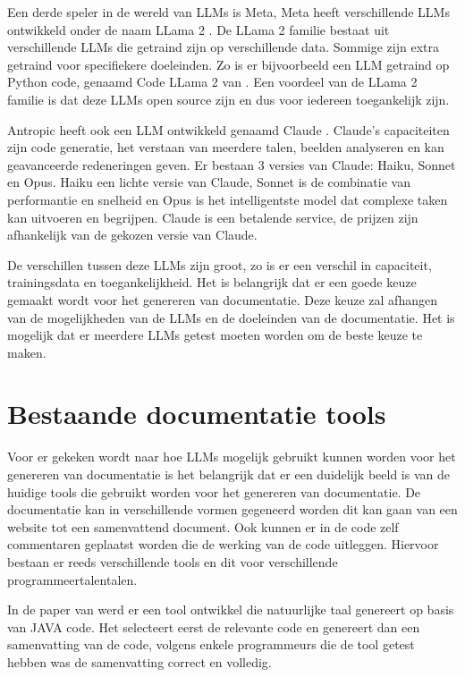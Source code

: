 Een derde speler in de wereld van LLMs is Meta, Meta heeft verschillende LLMs ontwikkeld onder de naam LLama 2 \autocite{Meta2024}.
De LLama 2 familie bestaat uit verschillende LLMs die getraind zijn op verschillende data. Sommige zijn extra getraind voor specifiekere doeleinden.
Zo is er bijvoorbeeld een LLM getraind op Python code, genaamd Code LLama 2 van \textcite{Roziere2024}.
Een voordeel van de LLama 2 familie is dat deze LLMs open source zijn en dus voor iedereen toegankelijk zijn.

Antropic heeft ook een LLM ontwikkeld genaamd Claude \autocite{Antropic2023}. 
Claude's capaciteiten zijn code generatie, het verstaan van meerdere talen, beelden analyseren en kan geavanceerde redeneringen geven.
Er bestaan 3 versies van Claude: Haiku, Sonnet en Opus.
Haiku een lichte versie van Claude, Sonnet is de combinatie van performantie en snelheid en Opus is het intelligentste model dat complexe taken kan uitvoeren en begrijpen.
Claude is een betalende service, de prijzen zijn afhankelijk van de gekozen versie van Claude.

De verschillen tussen deze LLMs zijn groot, zo is er een verschil in capaciteit, trainingsdata en toegankelijkheid.
Het is belangrijk dat er een goede keuze gemaakt wordt voor het genereren van documentatie.
Deze keuze zal afhangen van de mogelijkheden van de LLMs en de doeleinden van de documentatie.
Het is mogelijk dat er meerdere LLMs getest moeten worden om de beste keuze te maken.

\section{Bestaande documentatie tools}
\label{sec:huidige-tools}
Voor er gekeken wordt naar hoe LLMs mogelijk gebruikt kunnen worden voor het genereren van documentatie is het belangrijk dat er een duidelijk beeld is van de huidige tools die gebruikt worden voor het genereren van documentatie.
De documentatie kan in verschillende vormen gegeneerd worden dit kan gaan van een website tot een samenvattend document.
Ook kunnen er in de code zelf commentaren geplaatst worden die de werking van de code uitleggen.
Hiervoor bestaan er reeds verschillende tools en dit voor verschillende programmeertalentalen.

In de paper van \textcite{SridharaEtAL2010} werd er een tool ontwikkel die natuurlijke taal genereert op basis van JAVA code. 
Het selecteert eerst de relevante code en genereert dan een samenvatting van de code, volgens enkele programmeurs die de tool getest hebben was de samenvatting correct en volledig.

